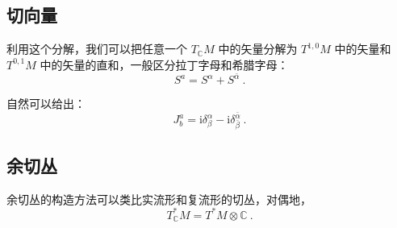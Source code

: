 \subsection{切向量}
利用这个分解，我们可以把任意一个 $T_\mathbb C M$ 中的矢量分解为 $T^{1, 0} M$ 中的矢量和 $T^{0, 1} M$ 中的矢量的直和，一般区分拉丁字母和希腊字母：
\begin{equation}
S^a = S^\alpha + S^{\bar \alpha} ~.
\end{equation}

自然可以给出：
\begin{equation}
J^a_b = \mathrm i \delta^\alpha_\beta - \mathrm i \delta^{\bar \alpha}_{\bar \beta} ~.
\end{equation}

\subsection{余切丛}
余切丛的构造方法可以类比实流形和复流形的切丛，对偶地，
\begin{equation}
T^*_\mathbb C M = T^* M \otimes \mathbb C ~.
\end{equation}

